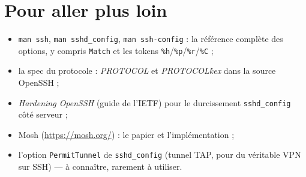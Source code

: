\documentclass[a4paper,10pt]{exam}
\begin{document}
\section{Pour aller plus loin}

\begin{itemize}
  \item \texttt{man ssh}, \texttt{man sshd\_config}, \texttt{man ssh-config} : la référence
        complète des options, y compris \texttt{Match} et les tokens
        \texttt{\%h}/\texttt{\%p}/\texttt{\%r}/\texttt{\%C} ;
  \item la spec du protocole : \emph{PROTOCOL} et \emph{PROTOCOL\.kex} dans la source
        OpenSSH ;
  \item \emph{Hardening OpenSSH} (guide de l'IETF) pour le durcissement
        \texttt{sshd\_config} côté serveur ;
  \item Mosh (\url{https://mosh.org/}) : le papier et l'implémentation ;
  \item l'option \texttt{PermitTunnel} de \texttt{sshd\_config} (tunnel TAP, pour du
        véritable VPN sur SSH) — à connaître, rarement à utiliser.
\end{itemize}
\end{document}
